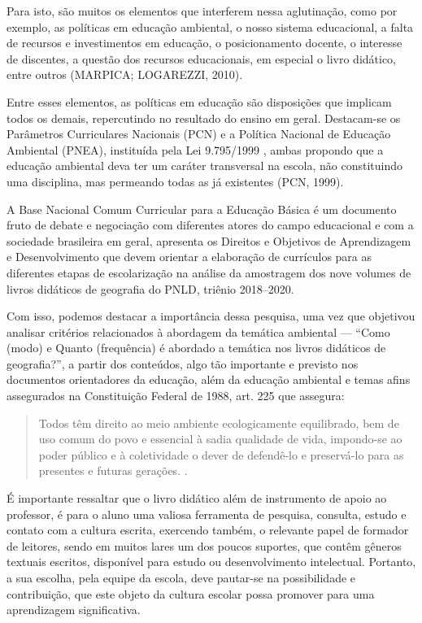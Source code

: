 \begin{refsection}
    Para isto, são muitos os elementos que interferem nessa aglutinação, como por exemplo, as políticas em educação ambiental, o nosso sistema educacional, a falta de recursos e investimentos em educação, o posicionamento docente, o interesse de discentes, a questão dos recursos educacionais, em especial o livro didático, entre outros  (MARPICA; LOGAREZZI, 2010).  

    Entre esses elementos, as políticas em educação são disposições que implicam todos os demais, repercutindo no resultado do ensino em geral. Destacam-se os Parâmetros Curriculares Nacionais (PCN) e a Política Nacional de Educação Ambiental (PNEA), instituída pela Lei 9.795/1999 \cite{PCN1999}, ambas propondo que a educação ambiental deva ter um caráter transversal na escola, não constituindo uma disciplina, mas permeando todas as já existentes (PCN, 1999). 

    A Base Nacional Comum Curricular \cite{BasNaCur2018} para a Educação Básica é um documento fruto de debate e negociação com diferentes atores do campo educacional e com a sociedade brasileira em geral, apresenta os Direitos e Objetivos de Aprendizagem e Desenvolvimento que devem orientar a elaboração de currículos para as diferentes etapas de escolarização na análise da amostragem dos nove volumes de livros didáticos de geografia do PNLD, triênio 2018--2020. 

    Com isso, podemos destacar a importância dessa pesquisa, uma vez que objetivou analisar critérios relacionados à abordagem da temática ambiental --- “Como (modo) e Quanto (frequência) é abordado a temática nos livros didáticos de geografia?”, a partir dos conteúdos, algo tão importante e previsto nos documentos orientadores da educação, além da educação ambiental e temas afins assegurados na Constituição Federal de 1988, art. 225 que assegura:  

    \begin{quotation}
        Todos têm direito ao meio ambiente ecologicamente equilibrado, bem de uso comum do povo e essencial à sadia qualidade de vida, impondo-se ao poder público e à coletividade o dever de defendê-lo e preservá-lo para as presentes e futuras gerações. \cite{ConstituiçãoBrasil1988}.
    \end{quotation}

    É importante ressaltar que o livro didático além de instrumento de apoio ao professor, é para o aluno uma valiosa ferramenta de pesquisa, consulta, estudo e contato com a cultura escrita, exercendo também, o relevante papel de formador de leitores, sendo em muitos lares um dos poucos suportes, que contêm gêneros textuais escritos, disponível para estudo ou desenvolvimento intelectual. Portanto, a sua escolha, pela equipe da escola, deve pautar-se na possibilidade e contribuição, que este objeto da cultura escolar possa promover para uma aprendizagem significativa.  


\end{refsection}
